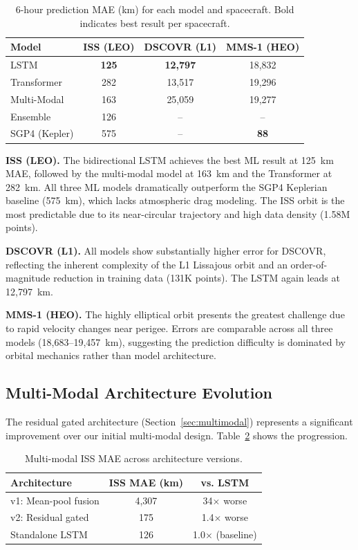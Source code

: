 \documentclass[twocolumn]{article}
\begin{document}
\begin{table}[h]
\centering
\caption{6-hour prediction MAE (km) for each model and spacecraft.
Bold indicates best result per spacecraft.}
\label{tab:results_all}
\begin{tabular}{lccc}
\toprule
Model & ISS (LEO) & DSCOVR (L1) & MMS-1 (HEO) \\
\midrule
LSTM           & \textbf{125} & \textbf{12,797} & 18,832 \\
Transformer    & 282          & 13,517          & 19,296 \\
Multi-Modal    & 163          & 25,059          & 19,277 \\
Ensemble       & 126          & --              & -- \\
\midrule
SGP4 (Kepler)  & 575          & --              & \textbf{88} \\
\bottomrule
\end{tabular}
\end{table}

\textbf{ISS (LEO).} The bidirectional LSTM achieves the best ML
result at 125~km MAE, followed by the multi-modal model at 163~km and
the Transformer at 282~km. All three ML models dramatically outperform
the SGP4 Keplerian baseline (575~km), which lacks atmospheric drag modeling. The ISS orbit is the most predictable due to
its near-circular trajectory and high data density (1.58M points).

\textbf{DSCOVR (L1).} All models show substantially higher error for
DSCOVR, reflecting the inherent complexity of the L1 Lissajous orbit
and an order-of-magnitude reduction in training data (131K points).
The LSTM again leads at 12,797~km.

\textbf{MMS-1 (HEO).} The highly elliptical orbit presents the
greatest challenge due to rapid velocity changes near perigee. Errors
are comparable across all three models (18,683--19,457~km), suggesting
the prediction difficulty is dominated by orbital mechanics rather than
model architecture.

\subsection{Multi-Modal Architecture Evolution}
\label{sec:evolution}

The residual gated architecture (Section~\ref{sec:multimodal})
represents a significant improvement over our initial multi-modal design.
Table~\ref{tab:evolution} shows the progression.

\begin{table}[h]
\centering
\caption{Multi-modal ISS MAE across architecture versions.}
\label{tab:evolution}
\begin{tabular}{lcc}
\toprule
Architecture & ISS MAE (km) & vs. LSTM \\
\midrule
v1: Mean-pool fusion & 4,307 & 34$\times$ worse \\
v2: Residual gated   & 175   & 1.4$\times$ worse \\
Standalone LSTM      & 126   & 1.0$\times$ (baseline) \\
\bottomrule
\end{tabular}
\end{table}
\end{document}
